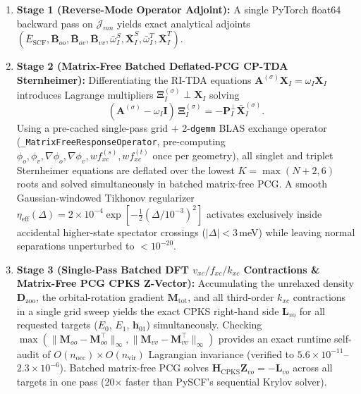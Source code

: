 \documentclass[10pt]{article}
\theoremstyle{natthm}
\begin{document}
\begin{enumerate}
  \item \textbf{Stage 1 (Reverse-Mode Operator Adjoint):} A single PyTorch float64 backward pass on $\mathcal{J}_{mn}$ yields exact analytical adjoints $(\bar{E}_{\mathrm{SCF}}, \bar{\mathbf{B}}_{oo}, \bar{\mathbf{B}}_{ov}, \bar{\mathbf{B}}_{vv}, \bar{\omega}_I^S, \bar{\mathbf{X}}_I^S, \bar{\omega}_I^T, \bar{\mathbf{X}}_I^T)$.
  \item \textbf{Stage 2 (Matrix-Free Batched Deflated-PCG CP-TDA Sternheimer):} Differentiating the RI-TDA equations $\mathbf{A}^{(\sigma)}\mathbf{X}_I = \omega_I\mathbf{X}_I$ introduces Lagrange multipliers $\boldsymbol{\Xi}_I^{(\sigma)} \perp \mathbf{X}_I$ solving
  \begin{equation}
    (\mathbf{A}^{(\sigma)} - \omega_I\mathbf{I})\,\boldsymbol{\Xi}_I^{(\sigma)} = -\mathbf{P}_I^\perp \bar{\mathbf{X}}_I^{(\sigma)}.
  \end{equation}
  Using a pre-cached single-pass grid + 2-\texttt{dgemm} BLAS exchange operator (\texttt{\_MatrixFreeResponseOperator}, pre-computing $\phi_o, \phi_v, \nabla\phi_o, \nabla\phi_v, w f_{xc}^{(s)}, w f_{xc}^{(t)}$ once per geometry), all singlet and triplet Sternheimer equations are deflated over the lowest $K = \max(N+2, 6)$ roots and solved simultaneously in batched matrix-free PCG.
  A smooth Gaussian-windowed Tikhonov regularizer $\eta_{\mathrm{eff}}(\Delta) = 2\times 10^{-4}\exp[-\tfrac{1}{2}(\Delta/10^{-3})^2]$ activates exclusively inside accidental higher-state spectator crossings ($|\Delta| < 3$\,meV) while leaving normal separations unperturbed to $<10^{-20}$.
  \item \textbf{Stage 3 (Single-Pass Batched DFT $v_{xc}/f_{xc}/k_{xc}$ Contractions \& Matrix-Free PCG CPKS Z-Vector):} Accumulating the unrelaxed density $\mathbf{D}_{\mathrm{zoo}}$, the orbital-rotation gradient $\mathbf{M}_{\mathrm{tot}}$, and all third-order $k_{xc}$ contractions in a single grid sweep yields the exact CPKS right-hand side $\mathbf{L}_{vo}$ for all requested targets ($E_0$, $E_1$, $\mathbf{h}_{01}$) simultaneously.
  Checking $\max(\|\mathbf{M}_{oo} - \mathbf{M}_{oo}^\top\|_\infty, \|\mathbf{M}_{vv} - \mathbf{M}_{vv}^\top\|_\infty)$ provides an exact runtime self-audit of $O(n_{\mathrm{occ}})\times O(n_{\mathrm{vir}})$ Lagrangian invariance (verified to $5.6\times 10^{-11}$--$2.3\times 10^{-6}$).
  Batched matrix-free PCG solves $\mathbf{H}_{\mathrm{CPKS}}\mathbf{Z}_{vo} = -\mathbf{L}_{vo}$ across all targets in one pass (20$\times$ faster than PySCF's sequential Krylov solver).

\end{enumerate}
\end{document}
